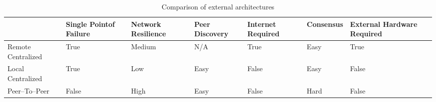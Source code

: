 \begin{table}
\centering
\footnotesize
\begin{tabularx}{\textwidth}{lXXXXXX}\toprule
    & Single Point\newline of Failure & Network Resilience & Peer \newline Discovery & Internet Required & Consensus & External Hardware Required \\\midrule
Remote Centralized & True                    & Medium              & N/A            & True              & Easy      & True                          \\
Local Centralized  & True                    & Low                 & Easy           & False             & Easy      & False                         \\
Peer--To--Peer     & False                   & High                & Easy           & False             & Hard      & False                         \\\bottomrule
\end{tabularx}
\caption{Comparison of external architectures}
\label{tbl:external_comparison}
\end{table}
